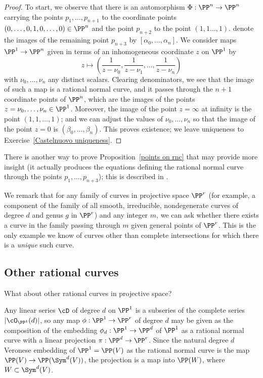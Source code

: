 \begin{proof}
To start, we observe that there is an automorphism $\Phi : \PP^n \to \PP^n$ carrying the points $p_1,\dots,p_{n+1}$ to the coordinate points $(0,\dots,0,1,0,\dots,0)\in \PP^n$ and the point $p_{n+2}$ to the point $(1,1\dots,1)$.  denote the images of the remaining  point $p_{n+3}$  by $[\alpha_0,\dots,\alpha_n]$. We consider maps $\PP^1 \to \PP^n$ given in terms of an inhomogeneous coordinate $z$ on $\PP^1$ by
$$
z \mapsto \left( \frac{1}{z - \nu_0}, \frac{1}{z - \nu_1} , \dots, \frac{1}{z - \nu_n}  \right)
$$
with $\nu_0,\dots,\nu_n$ any distinct scalars. Clearing denominators, we see that the image of such a map is a rational normal curve, and it passes through the $n+1$ coordinate points of $\PP^n$, which are the images of the points $z = \nu_0, \dots, \nu_n \in \PP^1$. Moreover, the image of the point $z = \infty$ at infinity is the point $(1,1, \dots,1)$; and we can adjust the values of $\nu_0,\dots,\nu_n$ so that the image of the point $z = 0$ is $(\beta_0,\dots,\beta_n)$. This proves existence; we leave uniqueness to Exercise~\ref{Castelnuovo uniqueness}. 
\end{proof}

There is another way to prove Proposition~\ref{points on rnc} that may provide more insight (it actually produces the equations defining the rational normal curve through the points $p_1,\dots,p_{n+3}$); this is described in \cite{Montreal}. 

We remark that for any family of curves in projective space $\PP^r$ (for example, a component of the family of all smooth, irreducible, nondegenerate curves of degree $d$ and genus $g$ in $\PP^r$) and any integer $m$, we can ask whether there exists a curve in the family passing through $m$ given general points of $\PP^r$. This is the only example we know of curves other than complete intersections for which there is a \emph{unique} such curve.


\subsection{Other rational curves}

What about other rational curves in projective space? 

Any linear series $\cD$ of degree $d$ on $\PP^1$ is a subseries of the complete series $|\cO_{\PP^1}(d)|$, so any map $\phi : \PP^1 \to \PP^r$ of degree $d$ may be given as the
composition of the embedding $\phi_d : \PP^1 \to \PP^d$ of $\PP^1$ as a rational normal curve with a linear projection $\pi : \PP^d \to \PP^r$. Since the natural degree $d$ Veronese embedding of $\PP^1 = \PP(V)$ as the rational normal curve is the map
$\PP(V) \to \PP(\Sym^d(V))$, the projection is a map into $\PP(W)$, where $W\subset \Sym^d(V)$. 

